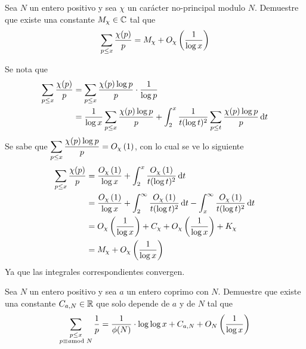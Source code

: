 \begin{prob}[7 pts.]
	Sea $N$ un entero positivo y sea $\chi$ un carácter no-principal modulo $N$. Demuestre que existe una constante $M_\chi\in\set{C}$ tal que
	\[\sum_{p\leq x}\frac{\chi(p)}{p}=M_\chi+\BigO[\chi]{\frac1{\log x}}\]
\end{prob}

\begin{sol}
	Se nota que
	\begin{align*}
		\sum_{p\leq x}\frac{\chi(p)}{p} & =\sum_{p\leq x}\frac{\chi(p)\log p}{p}\cdot \frac{1}{\log p}                                                               \\
		                                & =\frac1{\log x}\sum_{p\leq x}\frac{\chi(p)\log p}{p}+\int_2^x\frac1{t(\log t)^2}\sum_{p\leq t}\frac{\chi(p)\log p}{p}\d{t}
	\end{align*}
	Se sabe que $\ds \sum_{p\leq x}\frac{\chi(p)\log p}{p}=\BigO[\chi]{1}$, con lo cual se ve lo siguiente
	\begin{align*}
		\sum_{p\leq x}\frac{\chi(p)}{p} & =\frac{\BigO[\chi]{1}}{\log x}+\int_2^x\frac{\BigO[\chi]{1}}{t(\log t)^2}\d{t}                                                            \\
		                                & =\frac{\BigO[\chi]{1}}{\log x}+\int_2^\infty\frac{\BigO[\chi]{1}}{t(\log t)^2}\d{t}-\int_x^\infty\frac{\BigO[\chi]{1}}{t(\log t)^2}\d{t} \\
		                                & =\BigO[\chi]{\frac1{\log x}}+C_\chi+\BigO[\chi]{\frac1{\log x}}+K_\chi                                                                    \\
		                                & =M_\chi + \BigO[\chi]{\frac1{\log x}}
	\end{align*}
	Ya que las integrales correspondientes convergen.
\end{sol}

\begin{prob}
	Sea $N$ un entero positivo y sea $a$ un entero coprimo con $N$. Demuestre que existe una constante $C_{a,N}\in\set{R}$ que solo depende de $a$ y de $N$ tal que
	\[\sum_{\substack{p\leq x\\ p\equiv a\!\!\!\!\mod N}}\frac1p=\frac1{\phi(N)}\cdot\log\log x+C_{a,N}+\BigO[N]{\frac1{\log x}}\]
\end{prob}

\begin{sol}

\end{sol}

